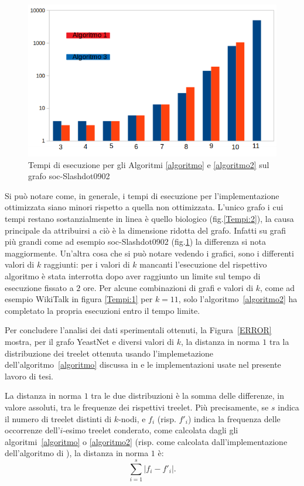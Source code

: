 \begin{figure}[htbp]
	\includegraphics[width=15.4cm]{capitolo4/tempiSOC}
	\caption{Tempi di esecuzione per gli Algoritmi \ref{algoritmo} e \ref{algoritmo2} sul grafo soc-Slashdot0902}
	\label{Tempi:4}
\end{figure}

Si può notare come, in generale, i tempi di esecuzione per l'implementazione ottimizzata siano minori rispetto a quella non ottimizzata.
L'unico grafo i cui tempi restano sostanzialmente in linea è quello biologico (fig.\ref{Tempi:2}), la causa principale da attribuirsi a ciò è la dimensione ridotta del grafo. 
Infatti su grafi più grandi come ad esempio soc-Slashdot0902 (fig.\ref{Tempi:4}) la differenza si nota maggiormente. 
Un'altra cosa che si può notare vedendo i grafici, sono i differenti valori di $ k $ raggiunti: per i valori di $k$ mancanti l'esecuzione del rispettivo algoritmo è stata interrotta dopo aver raggiunto un limite sul tempo di esecuzione fissato a $2$ ore.
Per alcune combinazioni di grafi e valori di $k$, come ad esempio WikiTalk in figura \ref{Tempi:1} per $ k=11$, solo l'algoritmo~\ref{algoritmo2} ha completato la propria esecuzioni entro il tempo limite.

Per concludere l'analisi dei dati sperimentali ottenuti,
la Figura~\ref{ERROR} mostra, per il grafo YeastNet e diversi valori di $k$, la distanza in norma $1$ tra 
la distribuzione dei treelet ottenuta usando l'implemetazione dell'algoritmo~\ref{algoritmo} discussa in \cite{bressan2019motivo} e le implementazioni usate nel presente lavoro di tesi.

La distanza in norma $1$ tra le due distribuzioni è la somma delle differenze, in valore assoluti, tra le frequenze dei rispettivi treelet.
Più precisamente, se $s$ indica il numero di treelet distinti di $k$-nodi, e $f_i$ (risp. $f'_i$) indica la frequenza delle occorrenze dell'$i$-esimo treelet  conderato, come calcolata dagli gli algoritmi~\ref{algoritmo} o \ref{algoritmo2} (risp. come calcolata dall'implementazione dell'algoritmo di \cite{bressan2019motivo}), la distanza in norma $1$ è:
\[
	\sum_{i=1}^{s}{\left| f_i - f'_i \right| }.
\]


